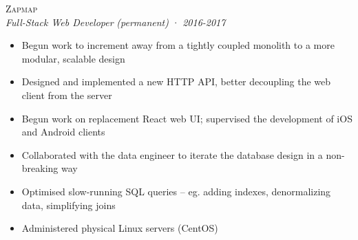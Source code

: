\documentclass[a4paper,10pt]{article}
\newcommand{\resumeSubheading}[5][12pt]{
  \vspace{#1}
  {\scshape{#2}} \\
  \textit{\small{#3}} \textit{\small{(#4)}} · \textit{\small{#5}}
  \vspace{2pt}
}
\newcommand{\resumeListStart}{\begin{itemize}}
\newcommand{\resumeListEnd}{\end{itemize}}
\newcommand{\resumeItem}[1]{
  \item[\-·]\small{{#1\vspace{1pt}}}
}
\begin{document}
  \begin{minipage}{\textwidth}
    \resumeSubheading
      {Zapmap}
      {Full-Stack Web Developer}
      {permanent}
      {2016-2017}
    \resumeListStart
      \resumeItem{Begun work to increment away from a tightly coupled monolith to a more modular, scalable design}
      \resumeItem{Designed and implemented a new HTTP API, better decoupling the web client from the server}
      \resumeItem{Begun work on replacement React web UI; supervised the development of iOS and Android clients}
      \resumeItem{Collaborated with the data engineer to iterate the database design in a non-breaking way}
      \resumeItem{Optimised slow-running SQL queries – eg. adding indexes, denormalizing data, simplifying joins}
      \resumeItem{Administered physical Linux servers (CentOS)}
    \resumeListEnd
  \end{minipage}

\end{document}

